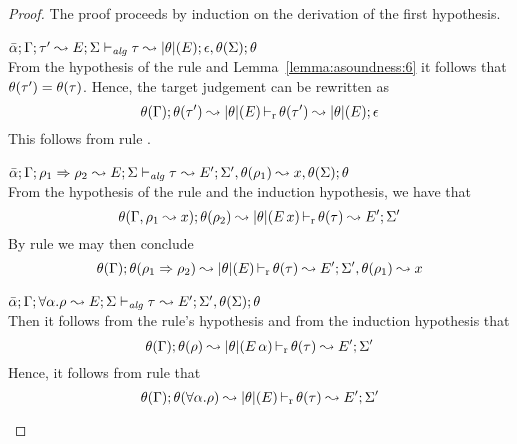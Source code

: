 \begin{proof}
The proof proceeds by induction on the derivation of the first hypothesis.
\begin{description}
\setlength{\itemsep}{1em}
\item[\fbox{\texttt{(Alg-M-Simp)}}]\quad$\bar{\alpha}; \Gamma; \tau' \leadsto E; \Sigma \vdash_{\mathit{alg}} \tau \leadsto |\theta|(E); \epsilon,\theta(\Sigma);\theta$ \ \\
From the hypothesis of the rule and Lemma~\ref{lemma:asoundness:6} it follows that
$\theta(\tau') = \theta(\tau)$. Hence, the target judgement can be rewritten as
\begin{equation*}
  \theta(\Gamma); \theta(\tau') \leadsto |\theta|(E) \mathop{\vdash_{\mathrm{r}}} \theta(\tau') \leadsto |\theta|(E); \epsilon
\end{equation*}
This follows from rule .

\item[\fbox{\texttt{(Alg-M-IApp)}}]\quad$\bar{\alpha}; \Gamma; \rho_1 \Rightarrow \rho_2~{\leadsto E}; \Sigma \vdash_{\mathit{alg}} \tau~{\leadsto E'}; \Sigma',\theta(\rho_1) \leadsto x, \theta(\Sigma);\theta$ \ \\
  From the hypothesis of the rule and the induction hypothesis, we have that
\begin{equation*}
 \theta(\Gamma,\rho_1 \leadsto x); \theta(\rho_2) \leadsto |\theta|(E\,x) \mathop{\vdash_{\mathrm{r}}} \theta(\tau) \leadsto E'; \Sigma' 
\end{equation*}
  By rule  we may then conclude
\begin{equation*}
 \theta(\Gamma); \theta(\rho_1 \Rightarrow \rho_2) \leadsto |\theta|(E) \mathop{\vdash_{\mathrm{r}}} \theta(\tau) \leadsto E'; \Sigma',\theta(\rho_1) \leadsto x
\end{equation*} 

\item[\fbox{\texttt{(Alg-M-TApp)}}]\quad$\bar{\alpha}; \Gamma; \forall \alpha. \rho~{\leadsto E}; \Sigma \vdash_{\mathit{alg}} \tau~{\leadsto E'}; \Sigma',\theta(\Sigma);\theta$ \ \\
  Then it follows from the rule's hypothesis and from the induction hypothesis that
\begin{equation*}
  \theta(\Gamma); \theta(\rho) \leadsto |\theta|(E\,\alpha) \mathop{\vdash_{\mathrm{r}}} \theta(\tau) \leadsto E'; \Sigma'
\end{equation*}
  Hence, it follows from rule  that
\begin{equation*}
  \theta(\Gamma); \theta(\forall \alpha.\rho) \leadsto |\theta|(E) \mathop{\vdash_{\mathrm{r}}} \theta(\tau) \leadsto E'; \Sigma'
\end{equation*}

\end{description}
\end{proof}


